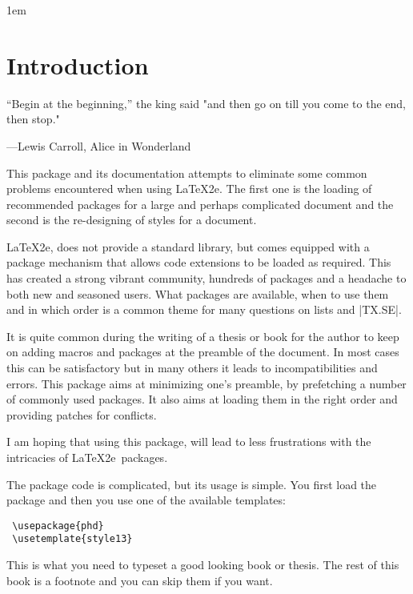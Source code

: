 \parindent1em

\chapter{Introduction}


\epigraph{``Begin at the beginning,'' the king said
"and then go on till you come to the end, then stop."}{
---Lewis Carroll, Alice in Wonderland}


\noindent This package and its documentation attempts to eliminate some common 
problems encountered when using \LaTeX2e. The first one is the loading of 
recommended packages for a large and perhaps complicated document and 
the second is the re-designing of styles for a document.

 \LaTeX2e, does not provide a standard library, but comes equipped with
 a package mechanism that allows code extensions to be loaded as required.
 This has created a strong vibrant community, hundreds of packages and a 
 headache to both new and seasoned users. What packages are available, when
 to use them and in which order is a common theme for many questions on
 lists and |TX.SE|.

 It is quite common during the writing of a thesis or book
 for the author to keep on adding macros and packages
 at the preamble of the document. In most cases this can
 be satisfactory but in many others it leads to
 incompatibilities and errors. This package aims at
 minimizing one's preamble, by prefetching a number of
 commonly used packages. It also aims at loading them
 in the right order and providing patches for conflicts.
 
 I am hoping that using this package, will lead to less
 frustrations with the intricacies of \LaTeX2e\ packages.

The package code is complicated, but its usage is simple. You first load the package and then
you use one of the available templates:

 \begin{commands}[]{}
 \begin{verbatim}
 \usepackage{phd}
 \usetemplate{style13}
 \end{verbatim}
 \end{commands}

This is what you need to typeset a good looking book or thesis. The rest of this book is a footnote and you can skip them if you want. 


